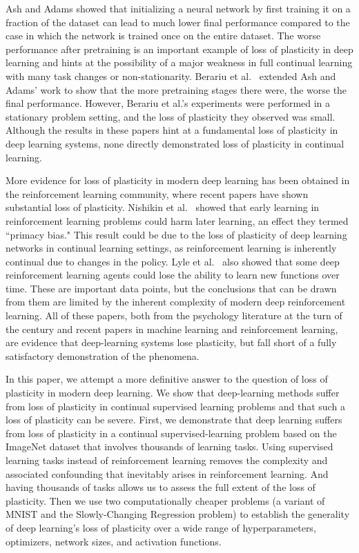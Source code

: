 \documentclass[review, number,3p]{elsarticle}
\begin{document}
Ash and Adams \cite{WarmStart2020} showed that initializing a neural network by first training it on a fraction of the dataset can lead to much lower final performance compared to the case in which the network is trained once on the entire dataset.
The worse performance after pretraining is an important example of loss of plasticity in deep learning and hints at the possibility of a major weakness in full continual learning with many task changes or non-stationarity. 
Berariu et al.\ \cite{plasticitystudy2021} extended Ash and Adams' work to show that the more pretraining stages there were, the worse the final performance. 
However, Berariu et al.’s experiments were performed in a stationary problem setting, and the loss of plasticity they observed was small.
Although the results in these papers hint at a fundamental loss of plasticity in deep learning systems, none directly demonstrated loss of plasticity in continual learning.

More evidence for loss of plasticity in modern deep learning has been obtained in the reinforcement learning community, where recent papers have shown substantial loss of plasticity.
Nishikin et al.\ \cite{primacy2022} showed that early learning in reinforcement learning problems could harm later learning, an effect they termed ``primacy bias."
This result could be due to the loss of plasticity of deep learning networks in continual learning settings, as reinforcement learning is inherently continual due to changes in the policy.
Lyle et al.\ \cite{capacityloss2022} also showed that some deep reinforcement learning agents could lose the ability to learn new functions over time.
These are important data points, but the conclusions that can be drawn from them are limited by the inherent complexity of modern deep reinforcement learning.
All of these papers, both from the psychology literature at the turn of the century and recent papers in machine learning and reinforcement learning, are evidence that deep-learning systems lose plasticity, but fall short of a fully satisfactory demonstration of the phenomena.

In this paper, we attempt a more definitive answer to the question of loss of plasticity in modern deep learning.
We show that deep-learning methods suffer from loss of plasticity in continual supervised learning problems and that such a loss of plasticity can be severe.
First, we demonstrate that deep learning suffers from loss of plasticity in a continual supervised-learning problem based on the ImageNet dataset that involves thousands of learning tasks. 
Using supervised learning tasks instead of reinforcement learning removes the complexity and associated confounding that inevitably arises in reinforcement learning.
And having thousands of tasks allows us to assess the full extent of the loss of plasticity.
Then we use two computationally cheaper problems (a variant of MNIST and the Slowly-Changing Regression problem) to establish the generality of deep learning's loss of plasticity over a wide range of hyperparameters, optimizers, network sizes, and activation functions. 
\end{document}
